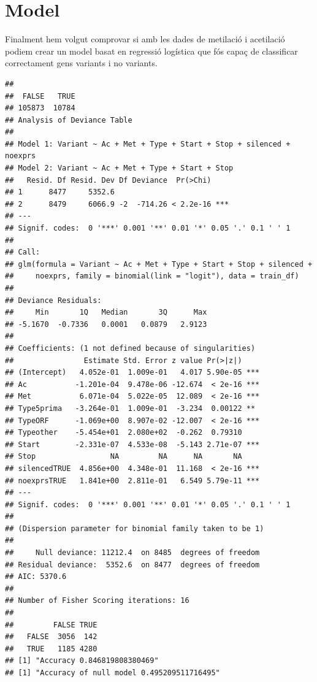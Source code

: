 \documentclass{article}\usepackage[]{graphicx}\usepackage[]{color}
\makeatletter
\newenvironment{kframe}{%
 \def\at@end@of@kframe{}%
 \ifinner\ifhmode%
  \def\at@end@of@kframe{\end{minipage}}%
  \begin{minipage}{\columnwidth}%
 \fi\fi%
 \def\FrameCommand##1{\hskip\@totalleftmargin \hskip-\fboxsep
 \colorbox{shadecolor}{##1}\hskip-\fboxsep
     \hskip-\linewidth \hskip-\@totalleftmargin \hskip\columnwidth}%
 \MakeFramed {\advance\hsize-\width
   \@totalleftmargin\z@ \linewidth\hsize
   \@setminipage}}%
 {\par\unskip\endMakeFramed%
 \at@end@of@kframe}
\newenvironment{knitrout}{}{} %
\makeatother
\begin{document}
\section{Model}
Finalment hem volgut comprovar si amb les dades de metilació i acetilació podiem crear un model basat en regressió logística que fós capaç de classificar correctament gens variants i no variants.
\begin{knitrout}
\color{fgcolor}\begin{kframe}
\begin{verbatim}
## 
##  FALSE   TRUE 
## 105873  10784
## Analysis of Deviance Table
## 
## Model 1: Variant ~ Ac + Met + Type + Start + Stop + silenced + noexprs
## Model 2: Variant ~ Ac + Met + Type + Start + Stop
##   Resid. Df Resid. Dev Df Deviance  Pr(>Chi)    
## 1      8477     5352.6                          
## 2      8479     6066.9 -2  -714.26 < 2.2e-16 ***
## ---
## Signif. codes:  0 '***' 0.001 '**' 0.01 '*' 0.05 '.' 0.1 ' ' 1
## 
## Call:
## glm(formula = Variant ~ Ac + Met + Type + Start + Stop + silenced + 
##     noexprs, family = binomial(link = "logit"), data = train_df)
## 
## Deviance Residuals: 
##     Min       1Q   Median       3Q      Max  
## -5.1670  -0.7336   0.0001   0.0879   2.9123  
## 
## Coefficients: (1 not defined because of singularities)
##                Estimate Std. Error z value Pr(>|z|)    
## (Intercept)   4.052e-01  1.009e-01   4.017 5.90e-05 ***
## Ac           -1.201e-04  9.478e-06 -12.674  < 2e-16 ***
## Met           6.071e-04  5.022e-05  12.089  < 2e-16 ***
## Type5prima   -3.264e-01  1.009e-01  -3.234  0.00122 ** 
## TypeORF      -1.069e+00  8.907e-02 -12.007  < 2e-16 ***
## Typeother    -5.454e+01  2.080e+02  -0.262  0.79310    
## Start        -2.331e-07  4.533e-08  -5.143 2.71e-07 ***
## Stop                 NA         NA      NA       NA    
## silencedTRUE  4.856e+00  4.348e-01  11.168  < 2e-16 ***
## noexprsTRUE   1.841e+00  2.811e-01   6.549 5.79e-11 ***
## ---
## Signif. codes:  0 '***' 0.001 '**' 0.01 '*' 0.05 '.' 0.1 ' ' 1
## 
## (Dispersion parameter for binomial family taken to be 1)
## 
##     Null deviance: 11212.4  on 8485  degrees of freedom
## Residual deviance:  5352.6  on 8477  degrees of freedom
## AIC: 5370.6
## 
## Number of Fisher Scoring iterations: 16
##        
##         FALSE TRUE
##   FALSE  3056  142
##   TRUE   1185 4280
## [1] "Accuracy 0.846819808380469"
## [1] "Accuracy of null model 0.495209511716495"
\end{verbatim}



\end{kframe}
\end{knitrout}
\end{document}
